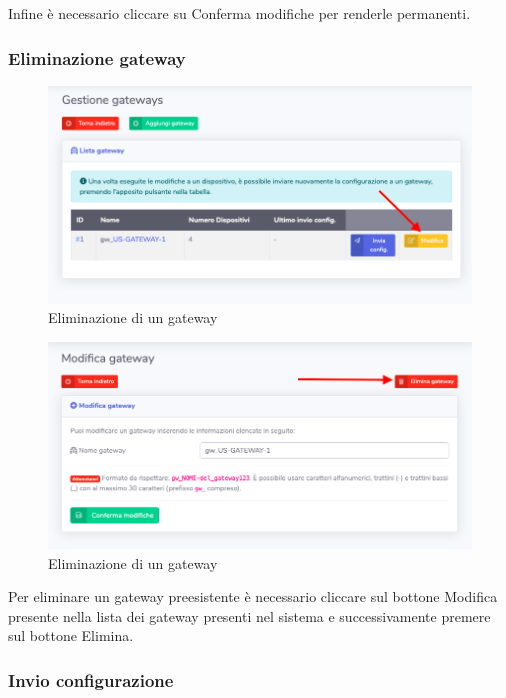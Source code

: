 		Infine è necessario cliccare su Conferma modifiche per renderle permanenti.

	\subsubsection{Eliminazione gateway}

		\begin{figure}[H]
		\centering
		\includegraphics[scale=0.600]{res/images/admin/selModGateway.png}
		\caption{Eliminazione di un gateway}
	\end{figure}

		\begin{figure}[H]
		\centering
		\includegraphics[scale=0.600]{res/images/admin/elimGateway.png}
		\caption{Eliminazione di un gateway}
	\end{figure}


		Per eliminare un gateway preesistente è necessario cliccare sul bottone Modifica presente nella lista dei gateway presenti nel sistema e successivamente premere sul bottone Elimina.

	\subsubsection{Invio configurazione}


